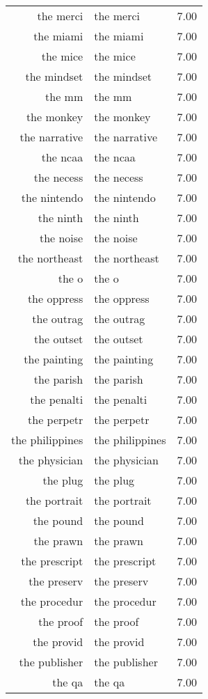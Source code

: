 \begin{table}[ht]
\begin{tabular}{rlr}
  the merci & the merci & 7.00 \\ 
  the miami & the miami & 7.00 \\ 
  the mice & the mice & 7.00 \\ 
  the mindset & the mindset & 7.00 \\ 
  the mm & the mm & 7.00 \\ 
  the monkey & the monkey & 7.00 \\ 
  the narrative & the narrative & 7.00 \\ 
  the ncaa & the ncaa & 7.00 \\ 
  the necess & the necess & 7.00 \\ 
  the nintendo & the nintendo & 7.00 \\ 
  the ninth & the ninth & 7.00 \\ 
  the noise & the noise & 7.00 \\ 
  the northeast & the northeast & 7.00 \\ 
  the o & the o & 7.00 \\ 
  the oppress & the oppress & 7.00 \\ 
  the outrag & the outrag & 7.00 \\ 
  the outset & the outset & 7.00 \\ 
  the painting & the painting & 7.00 \\ 
  the parish & the parish & 7.00 \\ 
  the penalti & the penalti & 7.00 \\ 
  the perpetr & the perpetr & 7.00 \\ 
  the philippines & the philippines & 7.00 \\ 
  the physician & the physician & 7.00 \\ 
  the plug & the plug & 7.00 \\ 
  the portrait & the portrait & 7.00 \\ 
  the pound & the pound & 7.00 \\ 
  the prawn & the prawn & 7.00 \\ 
  the prescript & the prescript & 7.00 \\ 
  the preserv & the preserv & 7.00 \\ 
  the procedur & the procedur & 7.00 \\ 
  the proof & the proof & 7.00 \\ 
  the provid & the provid & 7.00 \\ 
  the publisher & the publisher & 7.00 \\ 
  the qa & the qa & 7.00 \\ 

\end{tabular}
\end{table}
